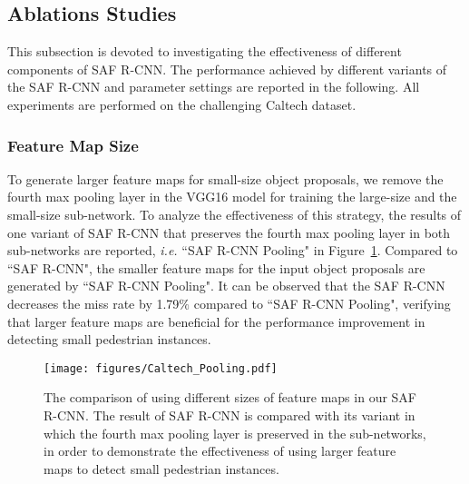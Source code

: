 \documentclass[journal]{IEEEtran}
\begin{document}
\subsection{Ablations Studies}
This subsection is devoted to investigating the effectiveness of different components of SAF R-CNN. The performance achieved by different variants of the SAF R-CNN and parameter settings are reported in the following. All experiments are performed on the challenging Caltech dataset.

\subsubsection{Feature Map Size}
To generate larger feature maps for small-size object proposals, we remove the fourth max pooling layer in the VGG16 model for training the large-size and the small-size sub-network. To analyze the effectiveness of this strategy, the results of one variant of SAF R-CNN that preserves the fourth max pooling layer in both sub-networks are reported, \emph{i.e.} ``SAF R-CNN Pooling" in Figure~\ref{fig:Caltech_Pooling}. Compared to ``SAF R-CNN", the smaller feature maps for the input object proposals are generated by ``SAF R-CNN Pooling". It can be observed that the SAF R-CNN decreases the miss rate by 1.79$\%$ compared to ``SAF R-CNN Pooling", verifying that larger feature maps are beneficial for the performance improvement in detecting small pedestrian instances. 

\begin{figure}
	\begin{center}
		\texttt{[image: figures/Caltech\_Pooling.pdf]}
		\caption{{The comparison of using different sizes of feature maps in our SAF R-CNN. The result of SAF R-CNN is compared with its variant in which the fourth max pooling layer is preserved in the sub-networks, in order to demonstrate the effectiveness of using larger feature maps to detect small pedestrian instances.}}	
		\label{fig:Caltech_Pooling}
	\end{center}
	\vspace{-4mm}
\end{figure}
\end{document}
